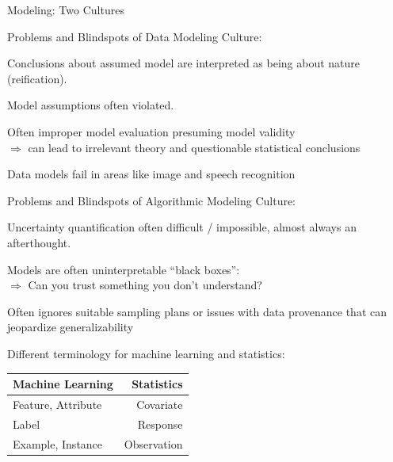 \documentclass[11pt,compress,t,notes=noshow, xcolor=table]{beamer}
\begin{document}
\begin{vbframe}{Modeling: Two Cultures}

\begin{blocki}{Problems and Blindspots of Data Modeling Culture:}
  \item Conclusions about assumed model are interpreted as being about nature (reification).
  \item Model assumptions often violated.
  \item Often improper model evaluation presuming model validity\\
  $\Rightarrow$ can lead to irrelevant theory and questionable statistical conclusions
  \item Data models fail in areas like image and speech recognition
\end{blocki}

\framebreak

\begin{blocki}{Problems and Blindspots of Algorithmic Modeling Culture:}
  \item Uncertainty quantification often difficult / impossible, almost always an afterthought.
  \item Models are often uninterpretable \enquote{black boxes}: \\
  $\Rightarrow$ Can you trust something you don't understand?
  \item Often ignores suitable sampling plans or issues with data provenance that can jeopardize generalizability
\end{blocki}

%
%


\framebreak
Different terminology for machine learning and statistics:

\begin{small}
  \begin{table}
    \begin{tabular}{lr}
      \hline
      Machine Learning & Statistics \\
      \hline
      Feature, Attribute & Covariate \\
      Label & Response \\
      Example, Instance & Observation \\[.3em]


\end{tabular}
\end{table}
\end{small}
\end{vbframe}
\end{document}
